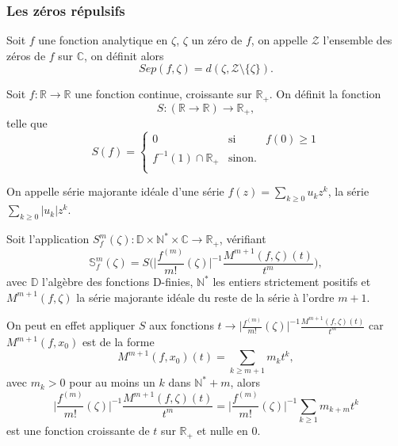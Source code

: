 \documentclass[a4paper,10pt]{article}
\begin{document}
	\subsubsection{Les zéros répulsifs}
	
	\begin{definition}
		Soit $f$ une fonction analytique en $\zeta$, $\zeta$ un zéro de $f$, on appelle $\mathcal{Z}$ l'ensemble des zéros de $f$ sur $\mathbb{C}$, on définit alors
		 \[Sep(f,\zeta)= d(\zeta, \mathcal{Z}\setminus\{\zeta\}).\]
	\end{definition}
	\begin{definition} Soit $f:\mathbb{R}\rightarrow\mathbb{R}$ une fonction continue, croissante sur $\mathbb{R}_+$. On définit la fonction \[S:(\mathbb{R} \rightarrow \mathbb{R}) \longrightarrow \mathbb{R}_+,\] 
	telle que
		\begin{equation}
		S(f)=
		\left\lbrace
		\begin{array}{ccc}
		0  & \mbox{si} & f(0) \geq 1\\
		f^{-1}(1)\cap \mathbb{R}_{+} & \mbox{sinon}.\\
		\end{array}\right.
		\end{equation}
	\end{definition}
	\begin{definition}
		On appelle série majorante idéale d'une série $f(z)=\sum_{k\geq0}u_kz^k$, la série $\sum_{k\geq0}|u_k|z^k$.
		\label{maj_ideal}
	\end{definition}
	\begin{definition}
		Soit l'application $S_{f}^{m}(\zeta) : \mathbb{D}\times \mathbb{N}^* \times \mathbb{C} \rightarrow \mathbb{R}_+$, vérifiant
		\[\mathbb{S}_{f}^{m}(\zeta)=S\Big(\Big|\frac{f^{(m)}}{m!}(\zeta)\Big|^{-1}\frac{M^{m+1}(f,\zeta)(t)}{t^{m}}\Big),\]
		avec $\mathbb{D}$ l'algèbre des fonctions D-finies, $\mathbb{N}^{*}$ les entiers strictement positifs et $M^{m+1}(f,\zeta)$ la série majorante idéale du reste de la série à l'ordre $m+1$.
	\end{definition}
	\vspace{7mm}
	\noindent On peut en effet appliquer $S$ aux fonctions $t \rightarrow \Big|\frac{f^{(m)}}{m!}(\zeta)\Big|^{-1}\frac{M^{m+1}(f,\zeta)(t)}{t^{m}}$ car $M^{m+1}(f,x_0)$ est de la forme
	\[M^{m+1}(f,x_0)(t)=\sum_{k \geq m+1} m_k t^k,\]
	avec $m_k >0$ pour au moins un $k$ dans $\mathbb{N}^{*}+m$, alors
	\[\Big|\frac{f^{(m)}}{m!}(\zeta)\Big|^{-1}\frac{M^{m+1}(f,\zeta)(t)}{t^{m}}=\Big|\frac{f^{(m)}}{m!}(\zeta)\Big|^{-1}\sum_{k \geq 1} m_{k+m} t^k\]
	est une fonction croissante de $t$ sur $\mathbb{R}_+$ et nulle en 0.
	\vspace{7mm}
	
\end{document}
